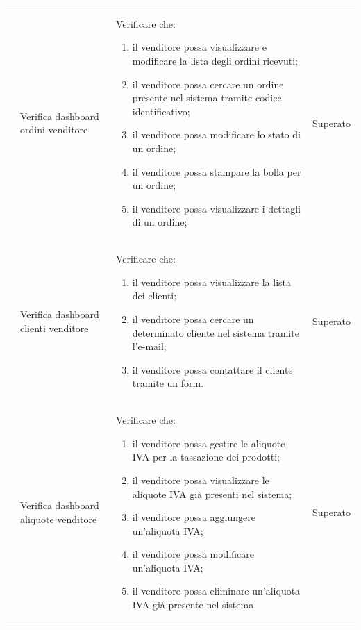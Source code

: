 \begin{center}
\begin{longtable}{|p{0.85cm}|p{2.25cm}|p{9cm}|p{3cm}|}
		 & Verifica dashboard ordini venditore & Verificare che:
		\begin{enumerate}
			\item il venditore possa visualizzare e modificare la lista degli ordini ricevuti;
			\item il venditore possa cercare un ordine presente nel sistema tramite codice identificativo;
			\item il venditore possa modificare lo stato di un ordine;
			\item il venditore possa stampare la bolla per un ordine;
			\item il venditore possa visualizzare i dettagli di un ordine;
		\end{enumerate} & Superato\\

		 & Verifica dashboard clienti venditore & Verificare che:
		\begin{enumerate}
			\item il venditore possa visualizzare la lista dei clienti;
			\item il venditore possa cercare un determinato cliente nel sistema tramite l'e-mail;
			\item il venditore possa contattare il cliente tramite un form.
		\end{enumerate} & Superato\\

		 & Verifica dashboard aliquote venditore & Verificare che:
		\begin{enumerate}
			\item il venditore possa gestire le aliquote IVA per la tassazione dei prodotti;
			\item il venditore possa visualizzare le aliquote IVA già presenti nel sistema;
			\item il venditore possa aggiungere un'aliquota IVA;
			\item il venditore possa modificare un'aliquota IVA;
			\item il venditore possa eliminare un'aliquota IVA già presente nel sistema.
		\end{enumerate}& Superato\\


\end{longtable}
\end{center}

